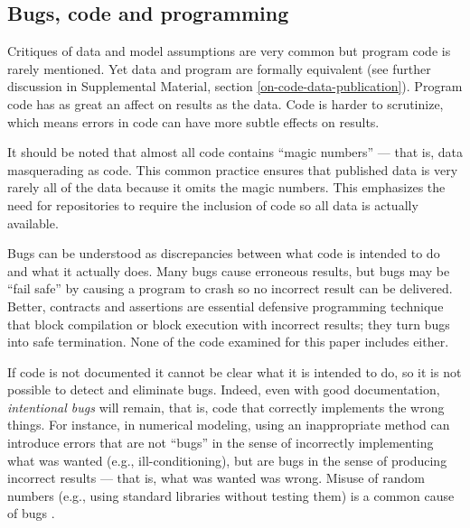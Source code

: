 \documentclass[10pt,letterpaper]{article}
\def\supplement{Supplemental Material}
\begin{document}

\subsection{Bugs, code and programming}\label{knowledge}
Critiques of data and model assumptions are very common \cite{critiques,diagnosis-reviews} but program code is rarely mentioned. Yet data and program are formally equivalent (see further discussion in \supplement, section \ref{on-code-data-publication}). Program code has as great an affect on results as the data. Code is harder to scrutinize, which means errors in code can have more subtle effects on results.

It should be noted that almost all code contains ``magic numbers'' --- that is, data masquerading as code. This common practice ensures that published data is very rarely all of the data because it omits the magic numbers. This emphasizes the need for repositories to require the inclusion of code so all data is actually available. 

Bugs can be understood as discrepancies between what code is intended to do and what it actually does. Many bugs cause erroneous results, but bugs may be ``fail safe'' by causing a program to crash so no incorrect result can be delivered. Better, contracts and assertions are essential defensive programming technique that block compilation or block execution with incorrect results; they turn bugs into safe termination. None of the code examined for this paper includes either. 

If code is not documented it cannot be clear what it is intended to do, so it is not possible to detect and eliminate bugs. Indeed, even with good documentation, \emph{intentional bugs\/} will remain, that is, code that correctly implements the wrong things. For instance, in numerical modeling, using an inappropriate method can introduce errors that are not ``bugs'' in the sense of incorrectly implementing what was wanted (e.g., ill-conditioning), but are bugs in the sense of producing incorrect results --- that is, what was wanted was wrong. Misuse of random numbers (e.g., using standard libraries without testing them) is a common cause of bugs \cite{knuth}.
\end{document}

